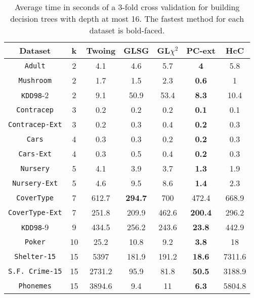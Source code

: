 \begin{table}[]
\small
\centering
\begin{tabular}{c|c|c|c|c|c|c}
Dataset             & k  & Twoing        & GLSG      & GL$\chi^2$  & PC-ext    & HcC    \\
\hline
{\tt Adult}         & 2  & 4.1           & 4.6       & 5.7         &{\bf 4}    & 5.8    \\
{\tt Mushroom}      & 2  & 1.7           & 1.5       & 2.3         &{\bf 0.6}  & 1      \\
{\tt KDD98}-2       & 2  & 9.1           & 50.9      & 53.4        &{\bf 8.3}  & 10.4   \\
{\tt Contracep}     & 3  & 0.2           & 0.2       & 0.2         &{\bf 0.1}  & 0.1    \\
{\tt Contracep-Ext} & 3  & 0.2           & 0.3       & 0.4         &{\bf 0.2}  & 0.3    \\
{\tt Cars}          & 4  & 0.3           & 0.3       & 0.2         &{\bf 0.2}  & 0.3    \\
{\tt Cars-Ext}      & 4  & 0.3           & 0.5       & 0.4         &{\bf 0.2}  & 0.3    \\
{\tt Nursery}       & 5  & 4.1           & 3.9       & 3.7         &{\bf 1.3}  & 1.9    \\
{\tt Nursery-Ext}   & 5  & 4.6           & 9.5       & 8.6         &{\bf 1.4}  & 2.3    \\
{\tt CoverType}     & 7  & 612.7         &{\bf 294.7}& 700         & 472.4     & 668.9  \\
{\tt CoverType-Ext} & 7  & 251.8         & 209.9     & 462.6       &{\bf 200.4}& 296.2  \\
{\tt KDD98}-9       & 9  & 434.5         & 256.2     & 243.6       &{\bf 23.8} & 442.9  \\
{\tt Poker}         & 10 & 25.2          & 10.8      & 9.2         &{\bf 3.8}  & 18     \\
{\tt Shelter-15}    & 15 & 5397          & 181.9     & 191.2       &{\bf 18.6} & 7311.6 \\
{\tt S.F. Crime-15} & 15 & 2731.2        & 95.9      & 81.8        &{\bf 50.5} & 3188.9 \\
{\tt Phonemes}      & 15 & 3894.6        & 9.4       & 11          &{\bf 6.3}  & 5804.8
\end{tabular}
\caption{Average time in seconds of a 3-fold cross validation
for building decision trees with depth at most 16.
The fastest method for each dataset is bold-faced.}
\label{tab:time-16}
\end{table}


